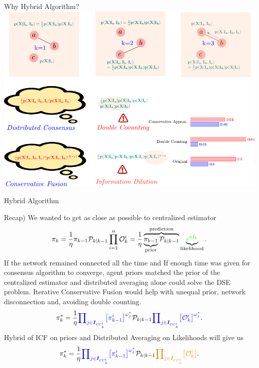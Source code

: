 \documentclass{beamer}
\newcommand{\bIs}[1]{\boldsymbol{I}_{#1}}  %
\theoremstyle{remark}
\newcommand{\suf}[1]{\textsc{\tiny #1}}  %
\begin{document}
\begin{frame}{Why Hybrid Algorithm?}
\centering
\includegraphics[width=.9\columnwidth]{scenario3}
\end{frame}
\begin{frame}{Hybrid Algorithm}
	
{\color{red} Recap)}
We wanted to get as close as possible to centralized estimator
	{\color{blue}
		\begin{equation*}
		{\pi}_{k}  = \frac{1}{\eta} {{\pi}_{k-1}}
			\mathcal{P}_{k \vert k-1}  
		\prod_{i=1}^{n} \mathcal{O}_k^i
		= \frac{1}{\eta}\overbrace{ \underbrace{{\pi}_{k-1}}_{\text{prior}} 
			\mathcal{P}_{k \vert k-1}  
		}^{\text{prediction}}\underbrace{{\color{green}e^{n\tilde{l}_k}}}_{\text{likelihood}}.
		\end{equation*}}
{\color{red} If} the network remained connected all the time and {\color{red} If} enough time was given for consensus algorithm to converge, agent priors matched the prior of the centralized estimator  and distributed averaging {\color{red}alone} could solve the DSE problem.
{\color{red} Iterative Conservative Fusion} would help with unequal prior, network disconnection and, avoiding double counting.
\begin{equation*}
 	{\pi}_{k}^*=	
	\frac{1}{\eta} 
	{\color{blue}{\prod\nolimits_{j \in \bIs{\suf{CC}^i_k} } }  
	\big[{\pi}^i_{k-1}\big]^{\omega_{j}^*}}
		\mathcal{P}_{k \vert k-1}
		{\color{blue}{\prod\nolimits_{j \in \bIs{\suf{CC}^i_k} } }\big[\mathcal{O}_k^i\big]^{\omega_{j}^*}		
		}.
\end{equation*}
Hybrid of {\color{blue}ICF on priors} and {\color{orange} Distributed Averaging on Likelihoods} will give us
\begin{equation*}
{\pi}_{k}^*=	
\frac{1}{\eta} 
{\color{blue}{\prod\nolimits_{j \in \bIs{\suf{CC}^i_k} } }  
	\big[{\pi}^i_{k-1}\big]^{\omega_{j}^*}}
	\mathcal{P}_{k \vert k-1}
	{\color{orange}{\prod\nolimits_{j \in \bIs{\suf{CC}^i_k} } }\big[\mathcal{O}_k^i\big]}		.
\end{equation*}
\end{frame}
\end{document}
